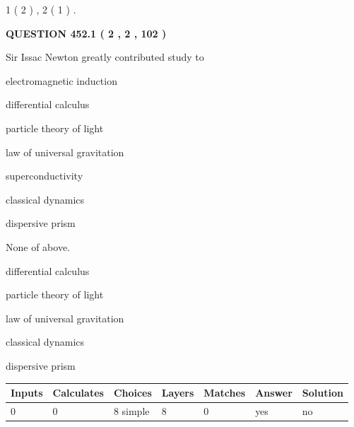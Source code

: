 \documentclass[12pt]{article}
\begin{document}
   
   1 ( 2 )
 ,
   2 ( 1 )
 .
  
\vspace{0.2in}
  
{\textbf{\Large{QUESTION
452.1 
 ( 2 , 2 , 102 )
}}}
  
  
Sir Issac Newton greatly contributed study to
 
 
electromagnetic induction
 
 
differential calculus
 
 
particle theory of light
 
 
law of universal gravitation
 
 
superconductivity
 
 
classical dynamics
 
 
dispersive prism
 
 
 None of above.
 
 
\noindent{}
 
 
differential calculus
 
 
particle theory of light
 
 
law of universal gravitation
 
 
classical dynamics
 
 
dispersive prism
 
 
\noindent{}
 
 
   
   
   
   
\noindent\begin{tabular}{|l|l|l|l|l|l|l|}
 \hline
Inputs & Calculates & Choices & Layers & Matches & Answer & Solution \\ \hline
 0  & 
 0  & 
 8
  simple  
  & 
 8  & 
 0  & 
  yes & 
  no 
  \\ \hline
 \end{tabular}
   
   
   
   
\noindent{}
   
\end{document}
